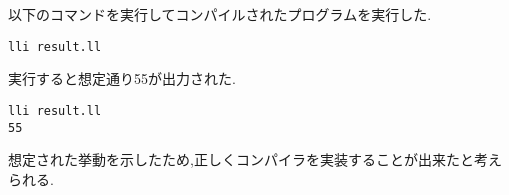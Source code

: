 \documentclass[main]{subfiles}
\begin{document}
以下のコマンドを実行してコンパイルされたプログラムを実行した.
\begin{oframed}
\begin{verbatim}
lli result.ll
\end{verbatim}
\end{oframed}
実行すると想定通り55が出力された.
\begin{lstlisting}[caption=k5-for.pをコンパイルしたプログラムを実行]
lli result.ll
55
\end{lstlisting}
想定された挙動を示したため,正しくコンパイラを実装することが出来たと考えられる.
\end{document}
